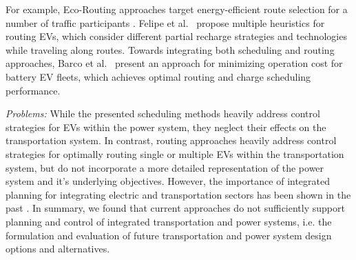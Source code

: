 For example, Eco-Routing approaches target energy-efficient route selection for a number of traffic participants \cite{ericsson2006optimizing}. 
Felipe et al.~\cite{felipe2014heuristic} propose multiple heuristics for routing EVs, which consider different partial recharge strategies and technologies while traveling along routes. 
Towards integrating both scheduling and routing approaches, Barco et al.~\cite{barco2013optimal} present an approach for minimizing operation cost for battery EV fleets, which achieves optimal routing and charge scheduling performance. 



\textit{Problems:} While the presented scheduling methods heavily address control strategies for EVs within the power system, they neglect their effects on the transportation system. In contrast, routing approaches heavily address control strategies for optimally routing single or multiple EVs within the transportation system, but do not incorporate a more detailed representation of the power system and it's underlying objectives. However, the importance of integrated planning for integrating electric and transportation sectors has been shown in the past \cite{mathiesen2008integrated}. In summary, we found that current approaches do not sufficiently support planning and control of integrated transportation and power systems, i.e. the formulation and evaluation of future transportation and power system design options and alternatives.


